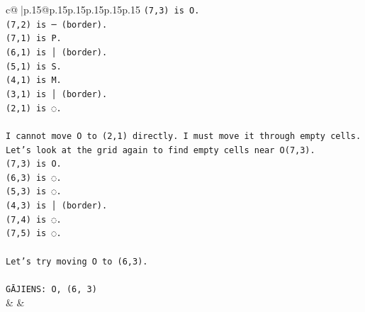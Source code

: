 \documentclass{article}
\begin{document}
{\begin{supertabular}{c@{$\;$}|p{.15\linewidth}@{}p{.15\linewidth}p{.15\linewidth}p{.15\linewidth}p{.15\linewidth}p{.15\linewidth}}
{{{\texttt{(7,3) is O.} \\
\texttt{(7,2) is ─ (border).} \\
\texttt{(7,1) is P.} \\
\texttt{(6,1) is │ (border).} \\
\texttt{(5,1) is S.} \\
\texttt{(4,1) is M.} \\
\texttt{(3,1) is │ (border).} \\
\texttt{(2,1) is ◌.} \\
\\ 
\texttt{I cannot move O to (2,1) directly. I must move it through empty cells.} \\
\texttt{Let's look at the grid again to find empty cells near O(7,3).} \\
\texttt{(7,3) is O.} \\
\texttt{(6,3) is ◌.} \\
\texttt{(5,3) is ◌.} \\
\texttt{(4,3) is │ (border).} \\
\texttt{(7,4) is ◌.} \\
\texttt{(7,5) is ◌.} \\
\\ 
\texttt{Let's try moving O to (6,3).} \\
\\ 
\texttt{GĀJIENS: O, (6, 3)} \\
            }
        }
    }
    & & \\ \\


\end{supertabular}}
\end{document}
